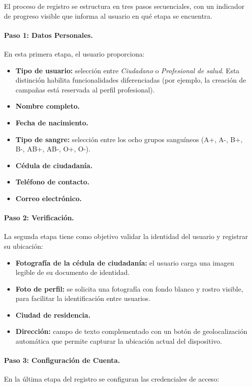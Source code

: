 \documentclass[12pt, a4paper]{article}
\begin{document}
El proceso de registro se estructura en tres pasos secuenciales, con un indicador de progreso visible que informa al usuario en qué etapa se encuentra.

\paragraph{Paso 1: Datos Personales.}
En esta primera etapa, el usuario proporciona:

\begin{itemize}
    \item \textbf{Tipo de usuario:} selección entre \textit{Ciudadano} o \textit{Profesional de salud}. Esta distinción habilita funcionalidades diferenciadas (por ejemplo, la creación de campañas está reservada al perfil profesional).
    \item \textbf{Nombre completo.}
    \item \textbf{Fecha de nacimiento.}
    \item \textbf{Tipo de sangre:} selección entre los ocho grupos sanguíneos (A+, A-, B+, B-, AB+, AB-, O+, O-).
    \item \textbf{Cédula de ciudadanía.}
    \item \textbf{Teléfono de contacto.}
    \item \textbf{Correo electrónico.}
\end{itemize}

\paragraph{Paso 2: Verificación.}
La segunda etapa tiene como objetivo validar la identidad del usuario y registrar su ubicación:

\begin{itemize}
    \item \textbf{Fotografía de la cédula de ciudadanía:} el usuario carga una imagen legible de su documento de identidad.
    \item \textbf{Foto de perfil:} se solicita una fotografía con fondo blanco y rostro visible, para facilitar la identificación entre usuarios.
    \item \textbf{Ciudad de residencia.}
    \item \textbf{Dirección:} campo de texto complementado con un botón de geolocalización automática que permite capturar la ubicación actual del dispositivo.
\end{itemize}

\paragraph{Paso 3: Configuración de Cuenta.}
En la última etapa del registro se configuran las credenciales de acceso:
\end{document}
